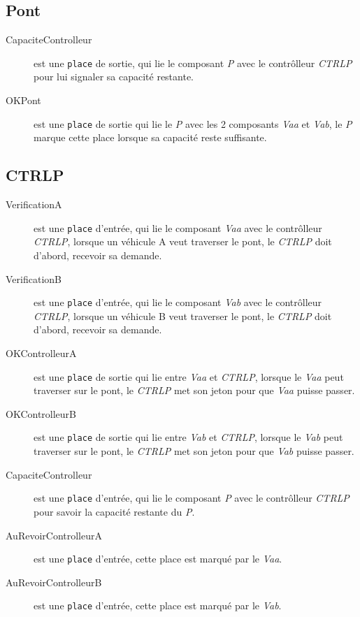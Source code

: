 \documentclass[a4paper,11pt]{report}
\begin{document}
	\subsection{Pont}
	\begin{description}
		\item[CapaciteControlleur] est une \texttt{place} de sortie, qui lie le composant \textit{P} avec le contrôlleur \textit{CTRLP} pour lui signaler sa capacité restante.
		\item[OKPont] est une \texttt{place} de sortie qui lie le \textit{P} avec les 2 composants \textit{Vaa} et \textit{Vab}, le \textit{P} marque cette place lorsque sa capacité reste suffisante.
	\end{description}	
	
	\subsection{CTRLP}
	\begin{description}
		\item[VerificationA] est une \texttt{place} d'entrée, qui lie le composant \textit{Vaa} avec le contrôlleur \textit{CTRLP}, lorsque un véhicule A veut traverser le pont, le \textit{CTRLP} doit d'abord, recevoir sa demande.
		\item[VerificationB] est une \texttt{place} d'entrée, qui lie le composant \textit{Vab} avec le contrôlleur \textit{CTRLP}, lorsque un véhicule B veut traverser le pont, le \textit{CTRLP} doit d'abord, recevoir sa demande.
		\item[OKControlleurA] est une \texttt{place} de sortie qui lie entre \textit{Vaa} et \textit{CTRLP}, lorsque le \textit{Vaa} peut traverser sur le pont, le \textit{CTRLP} met son jeton pour que \textit{Vaa} puisse passer.
		\item[OKControlleurB] est une \texttt{place} de sortie qui lie entre \textit{Vab} et \textit{CTRLP}, lorsque le \textit{Vab} peut traverser sur le pont, le \textit{CTRLP} met son jeton pour que \textit{Vab} puisse passer.
		\item[CapaciteControlleur] est une \texttt{place} d'entrée, qui lie le composant \textit{P} avec le contrôlleur \textit{CTRLP} pour savoir la capacité restante du \textit{P}.
		\item[AuRevoirControlleurA] est une \texttt{place} d'entrée, cette place est marqué par le \textit{Vaa}.
		\item[AuRevoirControlleurB] est une \texttt{place} d'entrée, cette place est marqué par le \textit{Vab}.
	\end{description}	
	
\end{document}
